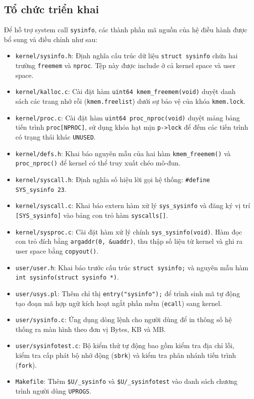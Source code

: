 \subsection{Tổ chức triển khai}
Để hỗ trợ system call \texttt{sysinfo}, các thành phần mã nguồn của hệ điều hành được bổ sung và điều chỉnh như sau:
\begin{itemize}
    \item \texttt{kernel/sysinfo.h}: Định nghĩa cấu trúc dữ liệu \texttt{struct sysinfo} chứa hai trường \texttt{freemem} và \texttt{nproc}. Tệp này được include ở cả kernel space và user space.
    \item \texttt{kernel/kalloc.c}: Cài đặt hàm \texttt{uint64 kmem\_freemem(void)} duyệt danh sách các trang nhớ rỗi (\texttt{kmem.freelist}) dưới sự bảo vệ của khóa \texttt{kmem.lock}.
    \item \texttt{kernel/proc.c}: Cài đặt hàm \texttt{uint64 proc\_nproc(void)} duyệt mảng bảng tiến trình \texttt{proc[NPROC]}, sử dụng khóa hạt mịn \texttt{p->lock} để đếm các tiến trình có trạng thái khác \texttt{UNUSED}.
    \item \texttt{kernel/defs.h}: Khai báo nguyên mẫu của hai hàm \texttt{kmem\_freemem()} và \texttt{proc\_nproc()} để kernel có thể truy xuất chéo mô-đun.
    \item \texttt{kernel/syscall.h}: Định nghĩa số hiệu lời gọi hệ thống: \texttt{\#define SYS\_sysinfo 23}.
    \item \texttt{kernel/syscall.c}: Khai báo extern hàm xử lý \texttt{sys\_sysinfo} và đăng ký vị trí \texttt{[SYS\_sysinfo]} vào bảng con trỏ hàm \texttt{syscalls[]}.
    \item \texttt{kernel/sysproc.c}: Cài đặt hàm xử lý chính \texttt{sys\_sysinfo(void)}. Hàm đọc con trỏ đích bằng \texttt{argaddr(0, \&uaddr)}, thu thập số liệu từ kernel và ghi ra user space bằng \texttt{copyout()}.
    \item \texttt{user/user.h}: Khai báo trước cấu trúc \texttt{struct sysinfo;} và nguyên mẫu hàm \texttt{int sysinfo(struct sysinfo *)}.
    \item \texttt{user/usys.pl}: Thêm chỉ thị \texttt{entry("sysinfo");} để trình sinh mã tự động tạo đoạn mã hợp ngữ kích hoạt ngắt phần mềm (\texttt{ecall}) sang kernel.
    \item \texttt{user/sysinfo.c}: Ứng dụng dòng lệnh cho người dùng để in thông số hệ thống ra màn hình theo đơn vị Bytes, KB và MB.
    \item \texttt{user/sysinfotest.c}: Bộ kiểm thử tự động bao gồm kiểm tra địa chỉ lỗi, kiểm tra cấp phát bộ nhớ động (\texttt{sbrk}) và kiểm tra phân nhánh tiến trình (\texttt{fork}).
    \item \texttt{Makefile}: Thêm \texttt{\$U/\_sysinfo} và \texttt{\$U/\_sysinfotest} vào danh sách chương trình người dùng \texttt{UPROGS}.
\end{itemize}

